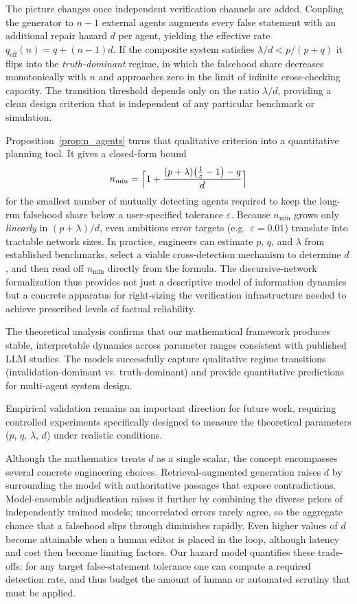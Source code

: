 \documentclass[12pt]{article}
\theoremstyle{definition}
\begin{document}
The picture changes once independent verification channels are added.
Coupling the generator to \(n-1\) external agents augments every false
statement with an additional repair hazard \(d\) per agent, yielding the
effective rate \(q_{\text{eff}}(n)=q+(n-1)d\).
If the composite system satisfies
\(\lambda/d < p/(p+q)\) it flips into the
\emph{truth-dominant} regime, in which the falsehood share decreases
monotonically with \(n\) and approaches zero in the limit of infinite
cross-checking capacity.  The transition threshold depends only on the
ratio \(\lambda/d\), providing a clean design criterion that is
independent of any particular benchmark or simulation.

Proposition~\ref{prop:n_agents} turns that qualitative
criterion into a quantitative planning tool.  It gives a closed-form
bound
\[
  n_{\min}
  =
  \Bigl\lceil
    1+\frac{(p+\lambda)\bigl(\tfrac1\varepsilon-1\bigr)-q}{d}
  \Bigr\rceil
\]
for the smallest number of mutually detecting agents required to keep
the long-run falsehood share below a user-specified tolerance
\(\varepsilon\).  Because \(n_{\min}\) grows only \emph{linearly} in
\((p+\lambda)/d\), even ambitious error targets (e.g.\ \(\varepsilon=0.01\))
translate into tractable network sizes.  In practice, engineers can
estimate \(p\), \(q\), and \(\lambda\) from established benchmarks,
select a viable cross-detection mechanism to determine \(d\), and then
read off \(n_{\min}\) directly from the formula.  The discursive-network
formalization thus provides not just a descriptive model of information
dynamics but a concrete apparatus for right-sizing the verification
infrastructure needed to achieve prescribed levels of factual
reliability.

The theoretical analysis confirms that our mathematical framework produces stable, interpretable dynamics across parameter ranges consistent with published LLM studies. The models successfully capture qualitative regime transitions (invalidation-dominant vs. truth-dominant) and provide quantitative predictions for multi-agent system design. 

Empirical validation remains an important direction for future work, requiring controlled experiments specifically designed to measure the theoretical parameters ($p$, $q$, $\lambda$, $d$) under realistic conditions.

Although the mathematics treats \(d\) as a single scalar, the concept
encompasses several concrete engineering choices.  Retrieval-augmented
generation raises \(d\) by surrounding the model with authoritative
passages that expose contradictions.  Model-ensemble adjudication raises
it further by combining the diverse priors of independently trained
models; uncorrelated errors rarely agree, so the aggregate chance that a
falsehood slips through diminishes rapidly.  Even higher values of
\(d\) become attainable when a human editor is placed in the loop,
although latency and cost then become limiting factors.  Our hazard
model quantifies these trade-offs: for any target false-statement
tolerance one can compute a required detection rate, and thus budget the
amount of human or automated scrutiny that must be applied.
\end{document}
